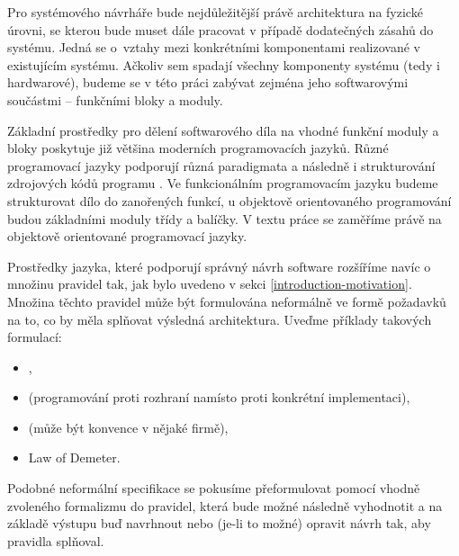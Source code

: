 Pro systémového návrháře bude nejdůležitější právě architektura na fyzické úrovni, se kterou bude muset dále pracovat v případě dodatečných zásahů do systému. Jedná se o~vztahy mezi konkrétními komponentami realizované v existujícím systému. Ačkoliv sem spadají všechny komponenty systému (tedy i hardwarové), budeme se v této práci zabývat zejména jeho softwarovými součástmi -- funkčními bloky a moduly.

Základní prostředky pro dělení softwarového díla na vhodné funkční moduly a bloky poskytuje již většina moderních programovacích jazyků. Různé programovací jazyky podporují různá paradigmata a následně i strukturování zdrojových kódů programu \cite{wiki:programming_paradigm}. Ve funkcionálním programovacím jazyku budeme strukturovat dílo do zanořených funkcí, u objektově orientovaného programování budou základními moduly třídy a balíčky. V textu práce se zaměříme právě na objektově orientované programovací jazyky.

Prostředky jazyka, které podporují správný návrh software rozšíříme navíc o množinu pravidel tak, jak bylo uvedeno v sekci \ref{introduction-motivation}. Množina těchto pravidel může být formulována neformálně ve formě požadavků na to, co by měla splňovat výsledná architektura. Uveďme příklady takových formulací:

\begin{itemize}
\item {},
\item {} (programování proti rozhraní namísto proti konkrétní implementaci),
\item {} (může být konvence v nějaké firmě),
\item Law of Demeter.
\end{itemize}

Podobné neformální specifikace se pokusíme přeformulovat pomocí vhodně zvoleného formalizmu do pravidel, která bude možné následně vyhodnotit a na základě výstupu buď navrhnout nebo (je-li to možné) opravit návrh tak, aby pravidla splňoval.
